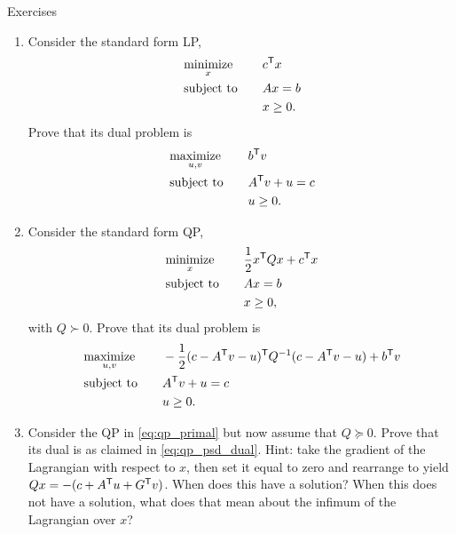 \begin{xcb}{Exercises}
\begin{enumerate}[label=\thechapter.\arabic*]
\settowidth{\leftmargini}{0.00.\hskip\labelsep}
\item \label{ex:lp_std_dual}
  Consider the standard form LP,
  \begin{alignat*}{2}
  &\operatorname*{minimize}_x \quad && c^{\mathsf{T}} x \\
  &\operatorname{subject\,\,to} \quad && Ax = b \\
  & && x \geq 0.
  \end{alignat*}
  Prove that its dual problem is 
  \begin{alignat*}{2}
  &\operatorname*{maximize}_{u,v} \quad && b^{\mathsf{T}} v \\
  &\operatorname{subject\,\,to} \quad && A^{\mathsf{T}} v + u = c \\
  & && u \geq 0.
  \end{alignat*}

\item \label{ex:qp_std_dual} 
  Consider the standard form QP,
  \begin{alignat*}{2}
  &\operatorname*{minimize}_x \quad && \frac{1}{2} x^{\mathsf{T}} Q x + c^{\mathsf{T}} x \\
  &\operatorname{subject\,\,to} \quad && Ax = b \\
  & && x \geq 0,
  \end{alignat*}
  with $Q \succ 0$. Prove that its dual problem is
  \begin{alignat*}{2}
  &\operatorname*{maximize}_{u,v} \quad && -\frac{1}{2} (c - A^{\mathsf{T}} v - u)^{\mathsf{T}} Q^{-1} (c - A^{\mathsf{T}} v
  - u) + b^{\mathsf{T}} v \\
  &\operatorname{subject\,\,to} \quad && A^{\mathsf{T}} v + u = c \\
  & && u \geq 0.
  \end{alignat*}

\item \label{ex:qp_psd_dual} 
  Consider the QP in \eqref{eq:qp_primal} but now assume that $Q \succeq
  0$. Prove that its dual is as claimed in \eqref{eq:qp_psd_dual}. Hint: take
  the gradient of the Lagrangian with respect to $x$, then set it equal to zero
  and rearrange to yield $Qx = -(c + A^{\mathsf{T}} u + G^{\mathsf{T}} v)$. When does this have a  
  solution? When this does not have a solution, what does that mean about the 
  infimum of the Lagrangian over $x$?   


\end{enumerate}
\end{xcb}
